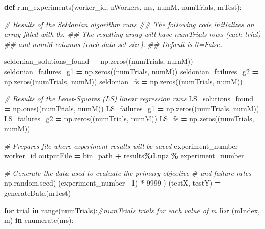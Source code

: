 \documentclass[12pt, twoside]{amherstthesis}
\newenvironment{Shaded}{\begin{snugshade}}{\end{snugshade}}
\newcommand{\BuiltInTok}[1]{#1}
\newcommand{\CommentTok}[1]{\textcolor[rgb]{0.56,0.35,0.01}{\textit{#1}}}
\newcommand{\ControlFlowTok}[1]{\textcolor[rgb]{0.13,0.29,0.53}{\textbf{#1}}}
\newcommand{\DecValTok}[1]{\textcolor[rgb]{0.00,0.00,0.81}{#1}}
\newcommand{\KeywordTok}[1]{\textcolor[rgb]{0.13,0.29,0.53}{\textbf{#1}}}
\newcommand{\NormalTok}[1]{#1}
\newcommand{\OperatorTok}[1]{\textcolor[rgb]{0.81,0.36,0.00}{\textbf{#1}}}
\newcommand{\SpecialCharTok}[1]{\textcolor[rgb]{0.81,0.36,0.00}{\textbf{#1}}}
\newcommand{\StringTok}[1]{\textcolor[rgb]{0.31,0.60,0.02}{#1}}
\begin{document}
\begin{Shaded}
\begin{Highlighting}[]
\KeywordTok{def}\NormalTok{ run\_experiments(worker\_id, nWorkers, ms, numM, numTrials, mTest):}
    
    \CommentTok{\# Results of the Seldonian algorithm runs}
    \CommentTok{\#\# The following code initializes an array filled with 0\textquotesingle{}s. }
    \CommentTok{\#\# The resulting array will have numTrials rows (each trial) }
    \CommentTok{\#\# and numM columns (each data set size).}
    \CommentTok{\#\# Default is 0=False.}
    
\NormalTok{    seldonian\_solutions\_found }\OperatorTok{=}\NormalTok{ np.zeros((numTrials, numM)) }
\NormalTok{    seldonian\_failures\_g1     }\OperatorTok{=}\NormalTok{ np.zeros((numTrials, numM)) }
\NormalTok{    seldonian\_failures\_g2     }\OperatorTok{=}\NormalTok{ np.zeros((numTrials, numM)) }
\NormalTok{    seldonian\_fs              }\OperatorTok{=}\NormalTok{ np.zeros((numTrials, numM)) }
    
    \CommentTok{\# Results of the Least{-}Squares (LS) linear regression runs}
\NormalTok{    LS\_solutions\_found }\OperatorTok{=}\NormalTok{ np.ones((numTrials, numM))  }
\NormalTok{    LS\_failures\_g1     }\OperatorTok{=}\NormalTok{ np.zeros((numTrials, numM)) }
\NormalTok{    LS\_failures\_g2     }\OperatorTok{=}\NormalTok{ np.zeros((numTrials, numM)) }
\NormalTok{    LS\_fs              }\OperatorTok{=}\NormalTok{ np.zeros((numTrials, numM)) }
    
    
    \CommentTok{\# Prepares file where experiment results will be saved}
\NormalTok{    experiment\_number }\OperatorTok{=}\NormalTok{ worker\_id}
\NormalTok{    outputFile }\OperatorTok{=}\NormalTok{ bin\_path }\OperatorTok{+} \StringTok{\textquotesingle{}results}\SpecialCharTok{\%d}\StringTok{.npz\textquotesingle{}} \OperatorTok{\%}\NormalTok{ experiment\_number}
    
    
    \CommentTok{\# Generate the data used to evaluate the primary objective }
    \CommentTok{\# and failure rates}
\NormalTok{    np.random.seed( (experiment\_number}\OperatorTok{+}\DecValTok{1}\NormalTok{) }\OperatorTok{*} \DecValTok{9999}\NormalTok{ )}
\NormalTok{    (testX, testY) }\OperatorTok{=}\NormalTok{ generateData(mTest) }
    
    
    \ControlFlowTok{for}\NormalTok{ trial }\KeywordTok{in} \BuiltInTok{range}\NormalTok{(numTrials):}\CommentTok{\#numTrials trials for each value of m }
        \ControlFlowTok{for}\NormalTok{ (mIndex, m) }\KeywordTok{in} \BuiltInTok{enumerate}\NormalTok{(ms): }
          

\end{Highlighting}
\end{Shaded}
\end{document}

